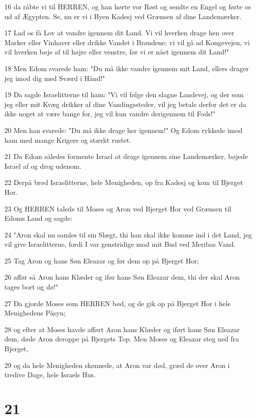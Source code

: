 \par 16 da råbte vi til HERREN, og han hørte vor Røst og sendte en Engel og førte os ud af Ægypten. Se, nu er vi i Byen Kadesj ved Grænsen af dine Landemærker.
\par 17 Lad os få Lov at vandre igennem dit Land. Vi vil hverken drage hen over Marker eller Vinhaver eller drikke Vandet i Brøndene; vi vil gå ad Kongevejen, vi vil hverken bøje af til højre eller venstre, før vi er nået igennem dit Land!"
\par 18 Men Edom svarede ham: "Du må ikke vandre igennem mit Land, ellers drager jeg imod dig med Sværd i Hånd!"
\par 19 Da sagde Israelitterne til ham: "Vi vil følge den slagne Landevej, og der som jeg eller mit Kvæg drikker af dine Vandingssteder, vil jeg betale derfor det er da ikke noget at være bange for, jeg vil kun vandre derigennem til Fods!"
\par 20 Men han svarede: "Du må ikke drage her igennem!" Og Edom rykkede imod ham med mange Krigere og stærkt rustet.
\par 21 Da Edom således formente Israel at drage igennem sine Landemærker, bøjede Israel af og drog udenom.
\par 22 Derpå brød Israelitterne, hele Menigheden, op fra Kadesj og kom til Bjerget Hor.
\par 23 Og HERREN talede til Moses og Aron ved Bjerget Hor ved Grænsen til Edoms Land og sagde:
\par 24 "Aron skal nu samles til sin Slægt, thi han skal ikke komme ind i det Land, jeg vil give Israelitterne, fordi I var genstridige mod mit Bud ved Meribas Vand.
\par 25 Tag Aron og hans Søn Eleazar og før dem op på Bjerget Hor;
\par 26 affør så Aron hans Klæder og ifør hans Søn Eleazar dem, thi der skal Aron tages bort og dø!"
\par 27 Da gjorde Moses som HERREN bød, og de gik op på Bjerget Hor i hele Menighedens Påsyn;
\par 28 og efter at Moses havde afført Aron hans Klæder og iført hans Søn Eleazar dem, døde Aron deroppe på Bjergets Top. Men Moses og Eleazar steg ned fra Bjerget,
\par 29 og da hele Menigheden skønnede, at Aron var død, græd de over Aron i tredive Dage, hele Israels Hus.

\chapter{21}

